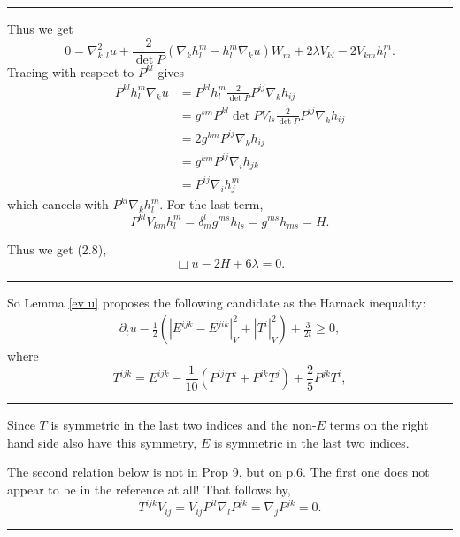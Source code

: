 \documentclass{amsart}
\theoremstyle{definition}
\theoremstyle{remark}
\numberwithin{equation}{section}
\newenvironment{note}{\hrule}{\hrule}
\begin{document}
\begin{note}
Thus we get
\[
0 = \nabla^2_{k,l} u + \frac{2}{\det P} \left(\nabla_k h_l^m  - h_l^m \nabla_k u\right) W_m + 2 \lambda V_{kl} - 2 V_{km} h_l^m.
\]
Tracing with respect to \(P^{kl}\) gives
\[
\begin{split}
P^{kl} h_l^m \nabla_k u &= P^{kl} h_l^m \frac{2}{\det P} P^{ij} \nabla_k h_{ij} \\
&= g^{sm} P^{kl} \det P V_{ls} \frac{2}{\det P} P^{ij} \nabla_k h_{ij} \\
&= 2 g^{km} P^{ij} \nabla_k h_{ij} \\
&= g^{km} P^{ij} \nabla_i h_{jk} \\
&= P^{ij} \nabla_i h_j^m
\end{split}
\]
which cancels with \(P^{kl} \nabla_k h_l^m\). For the last term,
\[
P^{kl} V_{km} h_l^m = \delta^l_m g^{ms} h_{ls} = g^{ms} h_{ms} = H.
\]

Thus we get (2.8),
\[
\Box u - 2 H + 6 \lambda = 0.
\]
\end{note}

So Lemma \ref{ev u} proposes the following candidate as the  Harnack inequality:
 \begin{align}\label{harnack est}
\partial_tu-\frac{1}{2}\left(\left|E^{ijk}-E^{jik}\right|^2_V+\left|T^i\right|_V^2\right)+\frac{3}{2t}\geq 0,
\end{align}
 where
 \[T^{ijk}=E^{ijk}-\frac{1}{10}\left(P^{ij}T^k+P^{ik}T^j\right)+\frac{2}{5}P^{jk}T^i,\]

\begin{note}
Since \(T\) is symmetric in the last two indices and the non-\(E\) terms on the right hand side also have this symmetry, \(E\) is symmetric in the last two indices.

The second relation below is not in Prop 9, but on p.6. The first one does not appear to be in the reference at all! That follows by,
\[
T^{ijk} V_{ij} = V_{ij} P^{il} \nabla_l P^{jk} = \nabla_j P^{jk} = 0.
\]
\end{note}
\end{document}
